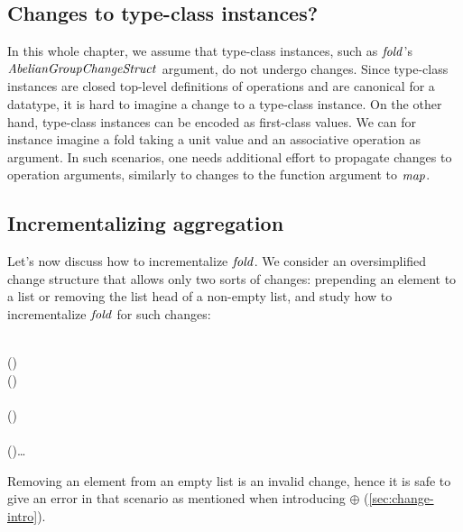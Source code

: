 \subsection{Changes to type-class instances?}
In this whole chapter, we assume that type-class instances, such as \ensuremath{\Varid{fold}}'s
\ensuremath{\Conid{AbelianGroupChangeStruct}} argument, do not undergo changes. Since
type-class instances are closed top-level definitions of operations and are
canonical for a datatype, it is hard to imagine a change to a type-class
instance. On the other hand, type-class instances can be encoded as first-class
values. We can for instance imagine a fold taking a unit value and an
associative operation as argument.
In such scenarios, one needs additional effort to propagate changes to operation
arguments, similarly to changes to the function argument to \ensuremath{\Varid{map}}.

\subsection{Incrementalizing aggregation}
\label{sec:incr-fold}
Let's now discuss how to incrementalize \ensuremath{\Varid{fold}}.
We consider an oversimplified change structure that
allows only two sorts of changes: prepending an element to a list or removing
the list head of a non-empty list, and study how to incrementalize \ensuremath{\Varid{fold}} for
such changes:

\begin{hscode}\SaveRestoreHook
{}%
%
%
\>[B]{}\;\;\mathrel{=}\;\mid {}\<[E]%
\\
\>[B]{}\;\;(\;)\;\<[E]%
\\
\>[B]{}\<[3]%
\>[3]{}\;\Delta (\;)\mathrel{=}\;\<[E]%
\\
\>[B]{}\<[3]%
\>[3]{}\oplus {}\;\mathrel{=}\;\;\<[E]%
\\
\>[B]{}\<[3]%
\>[3]{}(\;\;)\oplus {}\mathrel{=}\<[E]%
\\
\>[B]{}\<[3]%
\>[3]{}\oplus {}\mathrel{=}\;\<[E]%
\\[\blanklineskip]%
\>[B]{}\;\;(\;)\mathrel{=}\ldots{}\<[E]%
\ColumnHook
\end{hscode}\resethooks
Removing an element from an empty list is an invalid change, hence it is safe to
give an error in that scenario as mentioned when introducing \ensuremath{\oplus }
(\cref{sec:change-intro}).

